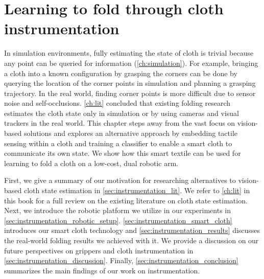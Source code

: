 \documentclass[\home/main.tex]{subfiles}
\begin{document}


\chapter{Learning to fold through cloth instrumentation}\label{ch:instrumentation}

In simulation environments, fully estimating the state of cloth is trivial because any point can be queried for information (\cref{ch:simulation}).
For example, bringing a cloth into a known configuration by grasping the corners can be done by querying the location of the corner points in simulation and planning a grasping trajectory.
In the real world, finding corner points is more difficult due to sensor noise and self-occlusions. \cref{ch:lit} concluded that existing folding research estimates the cloth state only in simulation or by using cameras and visual trackers in the real world. This chapter steps away from the vast focus on vision-based solutions and explores an alternative approach by embedding tactile sensing within a cloth and training a classifier to enable a smart cloth to communicate its own state. We show how this smart textile can be used for learning to fold a cloth on a low-cost, dual robotic arm.

First, we give a summary of our motivation for researching alternatives to vision-based cloth state estimation in \cref{sec:instrumentation_lit}. We refer to \cref{ch:lit} in this book for a full review on the existing literature on cloth state estimation. Next, we introduce the robotic platform we utilize in our experiments in \cref{sec:instrumentation_robotic_setup}. \cref{sec:instrumentation_smart_cloth} introduces our smart cloth technology and \cref{sec:instrumentation_results} discusses the real-world folding results we achieved with it.
We provide a discussion on our future perspectives on grippers and cloth instrumentation in \cref{sec:instrumentation_discussion}.
Finally, \cref{sec:instrumentation_conclusion} summarizes the main findings of our work on instrumentation.
\end{document}
